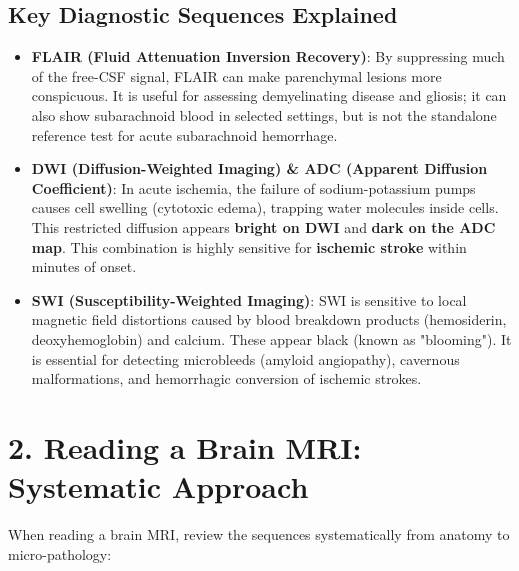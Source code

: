 \subsection*{Key Diagnostic Sequences Explained}
\begin{itemize}
    \item \textbf{FLAIR (Fluid Attenuation Inversion Recovery)}: By suppressing much of the free-CSF signal, FLAIR can make parenchymal lesions more conspicuous. It is useful for assessing demyelinating disease and gliosis; it can also show subarachnoid blood in selected settings, but is not the standalone reference test for acute subarachnoid hemorrhage.
    \item \textbf{DWI (Diffusion-Weighted Imaging) \& ADC (Apparent Diffusion Coefficient)}: In acute ischemia, the failure of sodium-potassium pumps causes cell swelling (cytotoxic edema), trapping water molecules inside cells. This restricted diffusion appears \textbf{bright on DWI} and \textbf{dark on the ADC map}. This combination is highly sensitive for \textbf{ischemic stroke} within minutes of onset.
    \item \textbf{SWI (Susceptibility-Weighted Imaging)}: SWI is sensitive to local magnetic field distortions caused by blood breakdown products (hemosiderin, deoxyhemoglobin) and calcium. These appear black (known as "blooming"). It is essential for detecting microbleeds (amyloid angiopathy), cavernous malformations, and hemorrhagic conversion of ischemic strokes.
\end{itemize}


\section*{2. Reading a Brain MRI: Systematic Approach}
When reading a brain MRI, review the sequences systematically from anatomy to micro-pathology:

